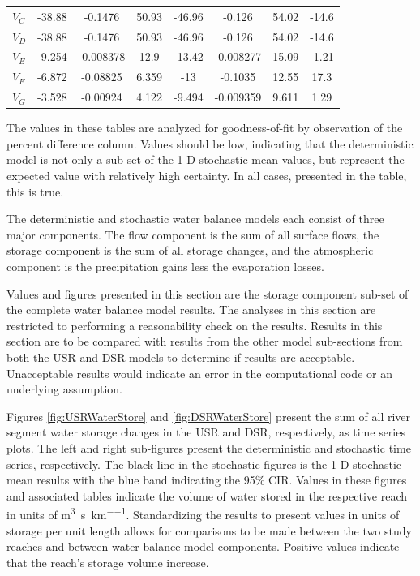 \begin{linenumbers}
\begin{table}[htbp]
\begin{tabular}{l|ccc|ccc|c}
	$V_{C}$&		-38.88&	-0.1476&	50.93&	-46.96&	-0.126&	54.02&	-14.6\\    
	$V_{D}$&		-38.88&	-0.1476&	50.93&	-46.96&	-0.126&	54.02&	-14.6\\    
	$V_{E}$&		-9.254&	-0.008378&	12.9&	-13.42&	-0.008277&	15.09&	-1.21\\
	$V_{F}$&		-6.872&	-0.08825&	6.359&	-13&	-0.1035&	12.55&	17.3\\ 
	$V_{G}$&		-3.528&	-0.00924&	4.122&	-9.494&	-0.009359&	9.611&	1.29\\ 
    \bottomrule
    \end{tabular}
\end{table}

The values in these tables are analyzed for goodness-of-fit by observation of the percent difference column.  Values should be low, indicating that the deterministic model is not only a sub-set of the 1-D stochastic mean values, but represent the expected value with relatively high certainty.  In all cases, presented in the table, this is true.

The deterministic and stochastic water balance models each consist of three major components.  The flow component is the sum of all surface flows, the storage component is the sum of all storage changes, and the atmospheric component is the precipitation gains less the evaporation losses.

Values and figures presented in this section are the storage component sub-set of the complete water balance model results.  The analyses in this section are restricted to performing a reasonability check on the results.  Results in this section are to be compared with results from the other model sub-sections from both the USR and DSR models to determine if results are acceptable.  Unacceptable results would indicate an error in the computational code or an underlying assumption.

Figures \ref{fig:USRWaterStore} and \ref{fig:DSRWaterStore} present the sum of all river segment water storage changes in the USR and DSR, respectively, as time series plots.  The left and right sub-figures present the deterministic and stochastic time series, respectively.  The black line in the stochastic figures is the 1-D stochastic mean results with the blue band indicating the 95\% CIR.  Values in these figures and associated tables indicate the volume of water stored in the respective reach in units of \si{\cubic\meter\per\second\per\kilo\meter}.  Standardizing the results to present values in units of storage per unit length allows for comparisons to be made between the two study reaches and between water balance model components.  Positive values indicate that the reach's storage volume increase. 


\end{linenumbers}
